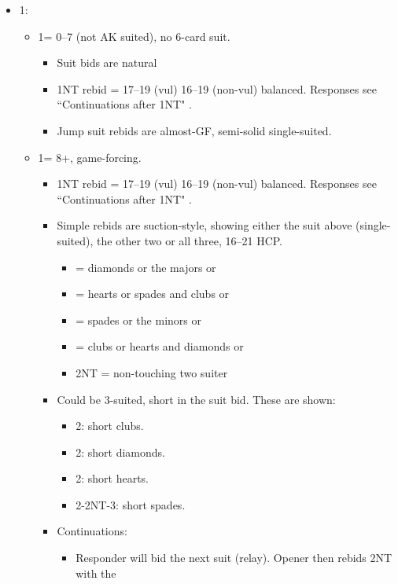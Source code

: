 \documentclass[a4paper,14pt]{extarticle}
\begin{document}
\begin{itemize}
\newpage

\item 1\diamonds:
	\begin{itemize}
   \item 1\hearts = 0--7 (not AK suited), no 6-card suit.
		\begin{itemize}
		\item Suit bids are natural
      \item 1NT rebid = 17--19 (vul) 16--19 (non-vul) balanced. Responses see ``Continuations after 1NT" .
      \item Jump suit rebids are almost-GF, semi-solid single-suited.
		\end{itemize}
   \item 1\spades = 8+, game-forcing.
		\begin{itemize}
      \item 1NT rebid = 17--19 (vul) 16--19 (non-vul) balanced. Responses see ``Continuations after 1NT" .
      \item Simple rebids are suction-style, showing either the suit above
         (single-suited), the other two or all three, 16--21 HCP.
			\begin{itemize}
			\item \clubs = diamonds or the majors or \diamonds\hearts\spades
			\item \diamonds = hearts or spades and clubs or \hearts\spades\clubs
			\item \hearts = spades or the minors or \spades\clubs\diamonds
			\item \spades = clubs or hearts and diamonds or \clubs\hearts\diamonds
			\item 2NT = non-touching two suiter
			\end{itemize}
		\item Could be 3-suited, short in the suit bid. These are shown: 
			\begin{itemize}
         \item 2\clubs: short clubs.
			\item 2\diamonds: short diamonds. 
			\item 2\hearts: short hearts.
         \item 2\spades-2NT-3\spades: short spades.
			\end{itemize}
		\item Continuations:
			\begin{itemize}
			\item Responder will bid the next suit (relay). Opener then rebids 2NT with the

\end{itemize}
\end{itemize}
\end{itemize}
\end{itemize}
\end{document}
